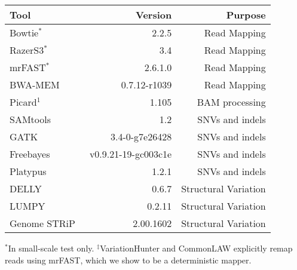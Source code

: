 \begin{table*}[htb]
\caption{Tools and their version numbers we used in this study.}
\begin{center}
\begin{tabular}{|l|r|r|}
\hline
{\bf Tool} & {\bf Version} & {\bf Purpose}\\
\hline
Bowtie$^*$~\citep{Langmead2009} & 2.2.5 & Read Mapping \\
RazerS3$^*$~\citep{Weese2012} & 3.4 & Read Mapping\\
mrFAST$^*$~\citep{Alkan2009} & 2.6.1.0 & Read Mapping \\
BWA-MEM~\citep{Li2013} & 0.7.12-r1039 & Read Mapping\\
Picard$^1$ & 1.105 & BAM processing\\
SAMtools~~\citep{Li2009b} & 1.2 & SNVs and indels\\
GATK~\citep{DePristo2011} & 3.4-0-g7e26428 & SNVs and indels\\
Freebayes~\citep{Garrison2012} & v0.9.21-19-gc003c1e & SNVs and indels\\
Platypus~\citep{Rimmer2014} & 1.2.1 & SNVs and indels\\
DELLY~\citep{Rausch2012} & 0.6.7 & Structural Variation\\
LUMPY~\citep{Layer2014} & 0.2.11 & Structural Variation\\
Genome STRiP~\citep{Handsaker2015} & 2.00.1602 & Structural Variation\\
\hline
\end{tabular}
\end{center}
{\footnotesize $^*$In small-scale test only. $^\ddag$VariationHunter and CommonLAW explicitly remap reads using mrFAST, which we show to be a deterministic mapper.}
\label{supptab:tools}
\end{table*}



